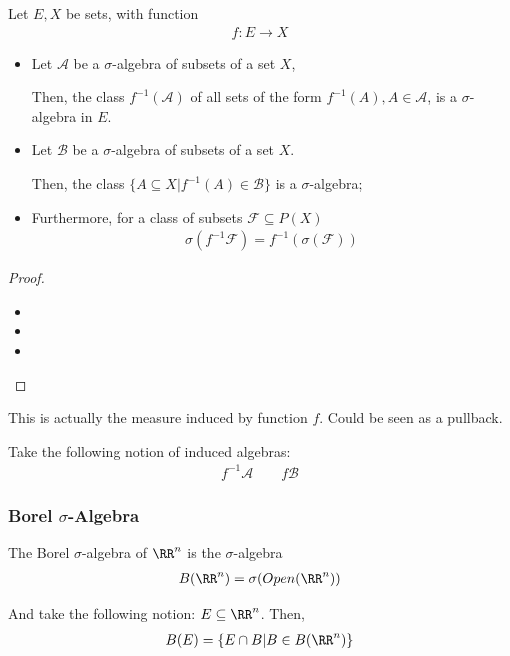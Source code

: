 \documentclass[Total.tex]{subfiles}
\begin{document}
					
					\begin{proposition}
						Let $E,X$ be sets, with function
						\begin{gather*}
							f:E\rightarrow X
						\end{gather*}
						\begin{itemize}
							\item 
							Let $\mathcal{A}$ be a $\sigma$-algebra of subsets of a set $X$, 
							
							Then, the class $f^{-1}(\mathcal{A})$ of all sets of the form $f^{-1}(A),A\in \mathcal{A}$, is a $\sigma$-algebra in $E$.
							\item Let $\mathcal{B}$ be a $\sigma$-algebra of subsets of a set $X$. 
							
							Then, the class $\{A\subseteq X|f^{-1}(A)\in \mathcal{B}\}$ is a $\sigma$-algebra;
							\item  Furthermore, for a class of subsets $\mathcal{F}\subseteq P(X)$
							\begin{gather*}
								\sigma(f^{-1}\mathscr{F})=f^{-1}(\sigma(\mathscr{F}))
							\end{gather*}
						\end{itemize}
					\end{proposition}
					\begin{proof}
						\begin{itemize}
							\item 
							\item 
							\item 
						\end{itemize}
					\end{proof}
					
					This is actually the measure induced by function $f$. Could be seen as a pullback. 
					
					\begin{Def}
						Take the following notion of induced algebras:
						\begin{gather*}
							f^{-1}\mathcal{A}\qquad f\mathcal{B}
						\end{gather*}
					\end{Def}
					
				\subsubsection{Borel $\sigma$-Algebra}
					\begin{Def}
						The Borel $\sigma$-algebra of $\RR^n$ is the $\sigma$-algebra
						\begin{gather*}
							B(\RR^n)=\sigma(Open(\RR^n))
						\end{gather*}
						
						And take the following notion: $E\subseteq \RR^n$. Then, 
						\begin{gather*}
							B(E)=\{E\cap B|B\in B(\RR^n)\}
						\end{gather*} 
					\end{Def}
					
\end{document}
